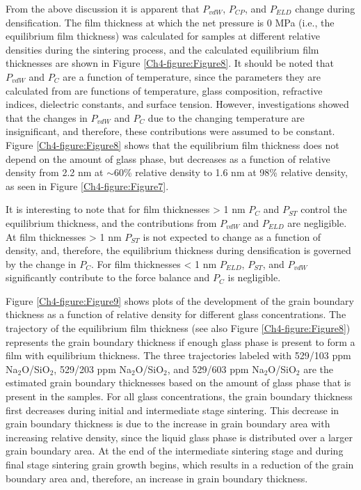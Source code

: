 From the above discussion it is apparent that $P_{vdW}$, $P_{CP}$, and $P_{ELD}$ change during densification. The film thickness at which the net pressure is 0 MPa (i.e., the equilibrium film thickness) was calculated for samples at different relative densities during the sintering process, and the calculated equilibrium film thicknesses are shown in Figure \ref{Ch4-figure:Figure8}. It should be noted that $P_{vdW}$ and $P_{C}$ are a function of temperature, since the parameters they are calculated from are functions of temperature, glass composition, refractive indices, dielectric constants, and surface tension. However, investigations showed that the changes in $P_{vdW}$ and $P_{C}$ due to the changing temperature are insignificant, and therefore, these contributions were assumed to be constant. Figure \ref{Ch4-figure:Figure8} shows that the equilibrium film thickness does not depend on the amount of glass phase, but decreases as a function of relative density from 2.2 nm at $\sim$60\% relative density to 1.6 nm at 98\% relative density, as seen in Figure \ref{Ch4-figure:Figure7}. 

It is interesting to note that for film thicknesses > 1 nm $P_{C}$ and $P_{ST}$ control the equilibrium thickness, and the contributions from $P_{vdW}$ and $P_{ELD}$ are negligible. At film thicknesses > 1 nm $P_{ST}$ is not expected to change as a function of density, and, therefore, the equilibrium thickness during densification is governed by the change in $P_{C}$. For film thicknesses < 1 nm $P_{ELD}$, $P_{ST}$, and $P_{vdW}$ significantly contribute to the force balance and $P_{C}$ is negligible.

Figure \ref{Ch4-figure:Figure9} shows plots of the development of the grain boundary thickness as a function of relative density for different glass concentrations. The trajectory of the equilibrium film thickness (see also Figure \ref{Ch4-figure:Figure8}) represents the grain boundary thickness if enough glass phase is present to form a film with equilibrium thickness. The three trajectories labeled with 529/103 ppm Na$_{2}$O/SiO$_{2}$, 529/203 ppm Na$_{2}$O/SiO$_{2}$, and 529/603 ppm Na$_{2}$O/SiO$_{2}$ are the estimated grain boundary thicknesses based on the amount of glass phase that is present in the samples. For all glass concentrations, the grain boundary thickness first decreases during initial and intermediate stage sintering. This decrease in grain boundary thickness is due to the increase in grain boundary area with increasing relative density, since the liquid glass phase is distributed over a larger grain boundary area. At the end of the intermediate sintering stage and during final stage sintering grain growth begins, which results in a reduction of the grain boundary area and, therefore, an increase in grain boundary thickness. 


